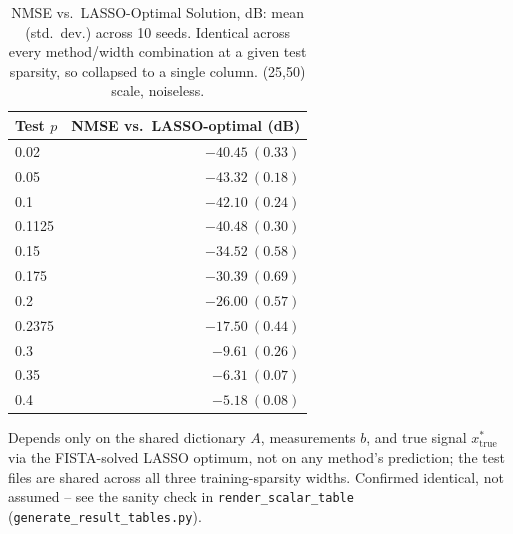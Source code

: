 \begin{table}[htbp]
\begin{minipage}{\linewidth}
\end{minipage}
\end{table}

\begin{table}[htbp]
\centering
\caption{NMSE vs.\ LASSO-Optimal Solution, dB: mean (std.\ dev.) across 10 seeds. Identical across every method/width combination at a given test sparsity, so collapsed to a single column. (25,50) scale, noiseless.}
\label{tab:exp2try2mb-nmse-lassoopt}
\begin{tabular}{@{} l r @{}}
\toprule
Test $p$ & NMSE vs.\ LASSO-optimal (dB) \\
\midrule
0.02 & $-40.45\ (0.33)$ \\
0.05 & $-43.32\ (0.18)$ \\
0.1 & $-42.10\ (0.24)$ \\
0.1125 & $-40.48\ (0.30)$ \\
0.15 & $-34.52\ (0.58)$ \\
0.175 & $-30.39\ (0.69)$ \\
0.2 & $-26.00\ (0.57)$ \\
0.2375 & $-17.50\ (0.44)$ \\
0.3 & $-9.61\ (0.26)$ \\
0.35 & $-6.31\ (0.07)$ \\
0.4 & $-5.18\ (0.08)$ \\
\bottomrule
\end{tabular}
\vspace{2pt}
\begin{minipage}{\linewidth}\footnotesize
Depends only on the shared dictionary $A$, measurements $b$, and true signal $x^*_{\text{true}}$ via the FISTA-solved LASSO optimum, not on any method's prediction; the test files are shared across all three training-sparsity widths. Confirmed identical, not assumed -- see the sanity check in \texttt{render\_scalar\_table} (\texttt{generate\_result\_tables.py}).
\end{minipage}
\end{table}
